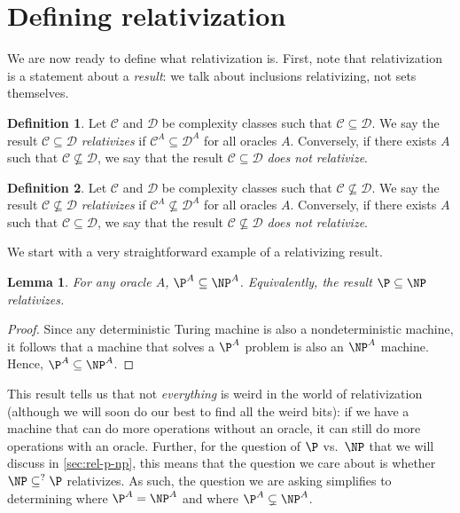 \documentclass[english]{reedthesis}
\theoremstyle{plain}
\newtheorem{lemma}[lemma]{Lemma}
\theoremstyle{definition}
\newtheorem{defn}[defn]{Definition}
\theoremstyle{remark}
\begin{document}
\section{Defining relativization}

We are now ready to define what relativization is. First, note that
relativization is a statement about a \emph{result}: we talk about inclusions
relativizing, not sets themselves.

\begin{defn}\label{def:relativization}
  Let $\mathcal{C}$ and $\mathcal{D}$ be complexity classes such that $\mathcal{C} \subseteq \mathcal{D}$. We say the result
  $\mathcal{C} \subseteq \mathcal{D}$ \emph{relativizes} if $\mathcal{C}^{A} \subseteq \mathcal{D}^{A}$ for all oracles $A$. Conversely,
  if there exists $A$ such that $\mathcal{C} \nsubseteq \mathcal{D}$, we say that the result $\mathcal{C} \subseteq \mathcal{D}$
  \emph{does not relativize}.
\end{defn}

\begin{defn}\label{def:relativization-ne}
  Let $\mathcal{C}$ and $\mathcal{D}$ be complexity classes such that $\mathcal{C} \nsubseteq \mathcal{D}$. We say the result
  $\mathcal{C} \nsubseteq \mathcal{D}$ \emph{relativizes} if $\mathcal{C}^{A} \nsubseteq \mathcal{D}^{A}$ for all oracles $A$. Conversely,
  if there exists $A$ such that $\mathcal{C} \subseteq \mathcal{D}$, we say that the result $\mathcal{C} \nsubseteq \mathcal{D}$
  \emph{does not relativize}.
\end{defn}

We start with a very straightforward example of a relativizing result.

\begin{lemma}\label{lem:pa-subset-npa}
  For any oracle $A$, $\P^{A} \subseteq \NP^{A}$. Equivalently, the result $\P \subseteq \NP$
  relativizes.
\end{lemma}

\begin{proof}
  Since any deterministic Turing machine is also a nondeterministic machine, it
  follows that a machine that solves a $\P^{A}$ problem is also an $\NP^{A}$
  machine. Hence, $\P^{A} \subseteq \NP^{A}$.
\end{proof}

This result tells us that not \emph{everything} is weird in the world of
relativization (although we will soon do our best to find all the weird bits):
if we have a machine that can do more operations without an oracle, it can still
do more operations with an oracle. Further, for the question of $\P$ vs.\ $\NP$
that we will discuss in \cref{sec:rel-p-np}, this means that the question we
care about is whether $\NP \subseteq^{?} \P$ relativizes. As such, the question we are
asking simplifies to determining where $\P^{A} = \NP^{A}$ and where
$\P^{A} \subsetneq \NP^{A}$.
\end{document}

